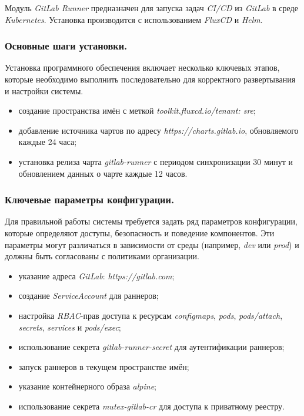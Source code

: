Модуль \textit{GitLab Runner} предназначен для запуска задач \textit{CI/CD} из \textit{GitLab} в среде \textit{Kubernetes}. Установка производится с использованием \textit{FluxCD} и \textit{Helm}.

\subsubsection{Основные шаги установки.} Установка программного обеспечения включает несколько ключевых этапов, которые необходимо выполнить последовательно для корректного развертывания и настройки системы.

\begin{itemize}
    \item создание пространства имён с меткой \textit{toolkit.fluxcd.io/tenant: sre};
    \item добавление источника чартов по адресу \textit{https://charts.gitlab.io}, обновляемого каждые 24 часа;
    \item установка релиза чарта \textit{gitlab-runner} с периодом синхронизации 30 минут и обновлением данных о чарте каждые 12 часов.
\end{itemize}

\subsubsection{Ключевые параметры конфигурации.} Для правильной работы системы требуется задать ряд параметров конфигурации, которые определяют доступы, безопасность и поведение компонентов. Эти параметры могут различаться в зависимости от среды (например, \textit{dev} или \textit{prod}) и должны быть согласованы с политиками организации.

\begin{itemize}
    \item указание адреса \textit{GitLab}: \textit{https://gitlab.com};
    \item создание \textit{ServiceAccount} для раннеров;
    \item настройка \textit{RBAC}-прав доступа к ресурсам \textit{configmaps}, \textit{pods}, \textit{pods/attach}, \textit{secrets}, \textit{services} и \textit{pods/exec};
    \item использование секрета \textit{gitlab-runner-secret} для аутентификации раннеров;
    \item запуск раннеров в текущем пространстве имён;
    \item указание контейнерного образа \textit{alpine};
    \item использование секрета \textit{mutex-gitlab-cr} для доступа к приватному реестру.
\end{itemize}




